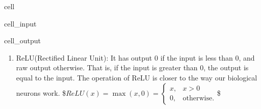 \documentclass[letterpaper,10pt,english]{jupyterBook}
\begin{document}
\begin{sphinxuseclass}{cell}\begin{sphinxVerbatimInput}

\begin{sphinxuseclass}{cell_input}
\begin{sphinxVerbatim}[commandchars=\\\{\}]
   
   

  
   
\end{sphinxVerbatim}

\end{sphinxuseclass}\end{sphinxVerbatimInput}
\begin{sphinxVerbatimOutput}

\begin{sphinxuseclass}{cell_output}
\noindent{}

\end{sphinxuseclass}\end{sphinxVerbatimOutput}

\end{sphinxuseclass}\begin{enumerate}
%
\item {} 
\sphinxAtStartPar
ReLU(Rectified Linear Unit): It has output 0 if the input is less
than 0, and raw output otherwise. That is, if the input is greater
than 0, the output is equal to the input. The operation of ReLU is
closer to the way our biological neurons work.
\$\( ReLU(x) = \max(x,0) = \begin{cases} x, & x>0\\ 0, & \text{otherwise}.\end{cases} \)\$

\end{enumerate}
\end{document}

